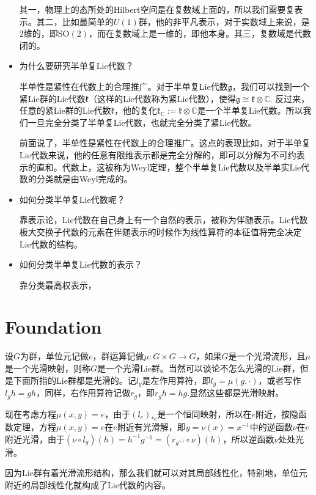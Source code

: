 \documentclass[9pt]{extarticle}
\newcommand{\cc}{\mathbb{C}}
\newcommand{\lag}{{\mathfrak{g}}}
\begin{document}
\begin{itemize}
其一，物理上的态所处的Hilbert空间是在复数域上面的，所以我们需要复表示。其二，比如最简单的$U(1)$群，他的非平凡表示，对于实数域上来说，是$2$维的，即$\mathrm{SO}(2)$，而在复数域上是一维的，即他本身。其三，复数域是代数闭的。

\item 为什么要研究半单复Lie代数？

半单性是紧性在代数上的合理推广。对于半单复Lie代数$\lag$，我们可以找到一个紧Lie群的Lie代数$\mathfrak{k}$（这样的Lie代数称为紧Lie代数），使得$\lag\cong \mathfrak{k}\otimes \cc$. 反过来，任意的紧Lie群的Lie代数$\mathfrak{k}$，他的复化$\mathfrak{k}_{\cc}:=\mathfrak{k}\otimes \cc$是一个半单复Lie代数。所以我们一旦完全分类了半单复Lie代数，也就完全分类了紧Lie代数。

前面说了，半单性是紧性在代数上的合理推广。这点的表现比如，对于半单复Lie代数来说，他的任意有限维表示都是完全分解的，即可以分解为不可约表示的直和。代数上，这被称为Weyl定理，整个半单复Lie代数以及半单实Lie代数的分类就是由Weyl完成的。

\item 如何分类半单复Lie代数呢？

靠表示论，Lie代数在自己身上有一个自然的表示，被称为伴随表示。Lie代数极大交换子代数的元素在伴随表示的时候作为线性算符的本征值将完全决定Lie代数的结构。

\item 如何分类半单复Lie代数的表示？

靠分类最高权表示，

\end{itemize}

\section{Foundation}

\para 设$G$为群，单位元记做$e$，群运算记做$\mu:G\times G\to G$，如果$G$是一个光滑流形，且$\mu$是一个光滑映射，则称$G$是一个光滑Lie群。当然可以谈论不怎么光滑的Lie群，但是下面所指的Lie群都是光滑的。记$l_g$是左作用算符，即$l_g=\mu(g,\cdot)$，或者写作$l_gh=gh$，同样，右作用算符记做$r_g$，即$r_gh=hg$.显然这些都是光滑映射。

现在考虑方程$\mu(x,y)=e$，由于$(l_e)_{*e}$是一个恒同映射，所以在$e$附近，按隐函数定理，方程$\mu(x,y)=e$在$e$附近有光滑解，即$y=\nu(x)=x^{-1}$中的逆函数$\nu$在$e$附近光滑，由于$(\nu\circ l_g)(h)=h^{-1}g^{-1}=(r_{g^{-1}}\circ \nu)(h)$，所以逆函数$\nu$处处光滑。

因为Lie群有着光滑流形结构，那么我们就可以对其局部线性化，特别地，单位元附近的局部线性化就构成了Lie代数的内容。
\end{document}
